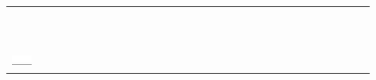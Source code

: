 \documentclass[10pt]{article}
\begin{document}
\begin{center}
\begin{tabular}{|c|c|c|c|c|c|c|c|c|c|c|c|c|c|c|c|c|c|c|c|c|c|c|c|c|c|c|c|c|c|c|}
\hline
 &  &  &  &  &  &  &  &  &  &  &  &  &  &  &  &  &  &  &  &  &  &  &  &  &  &  &  &  &  &  \\
\hline
 &  &  &  &  &  &  &  &  &  &  &  &  &  &  &  &  &  &  &  &  &  &  &  &  &  &  &  &  &  &  \\
\hline
 &  &  &  &  &  &  &  &  &  &  &  &  &  &  &  &  &  &  &  &  &  &  &  &  &  &  &  &  &  &  \\
\hline
 &  &  &  &  &  &  &  &  &  &  &  &  &  &  &  &  &  &  &  &  &  &  &  &  &  &  &  &  &  &  \\
\hline
 &  &  &  &  &  &  &  &  &  &  &  &  &  &  &  &  &  &  &  &  &  &  &  &  &  &  &  &  &  &  \\
\hline
 &  &  &  &  &  &  &  &  &  &  &  &  &  &  &  &  &  &  &  &  &  &  &  &  &  &  &  &  &  &  \\
\hline
 &  &  &  &  &  &  &  &  &  &  &  &  &  &  &  &  &  &  &  &  &  &  &  &  &  &  &  &  &  &  \\
\hline
 &  &  &  &  &  &  &  &  &  &  &  &  &  &  &  &  &  &  &  &  &  &  &  &  &  &  &  &  &  &  \\
\hline
 &  &  &  &  &  &  &  &  &  &  &  &  &  &  &  &  &  &  &  &  &  &  &  &  &  &  &  &  &  &  \\
\hline
 &  &  &  &  &  &  &  &  &  &  &  &  &  &  &  &  &  &  &  &  &  &  &  &  &  &  &  &  &  &  \\
\hline
 &  &  &  &  &  &  &  &  &  &  &  &  &  &  &  &  &  &  &  &  &  &  &  &  &  &  &  &  &  &  \\
\hline
 &  &  &  &  &  &  &  &  &  &  &  &  &  &  &  &  &  &  &  &  &  &  &  &  &  &  &  &  &  &  \\
\hline
\includegraphics[max width=\textwidth]{2024_11_21_12a27a32a51fef2c834ag-05}
 &  &  &  &  &  &  &  &  &  &  &  &  &  &  &  &  &  &  &  &  &  &  &  &  &  &  &  &  &  &  \\

\end{tabular}
\end{center}
\end{document}
